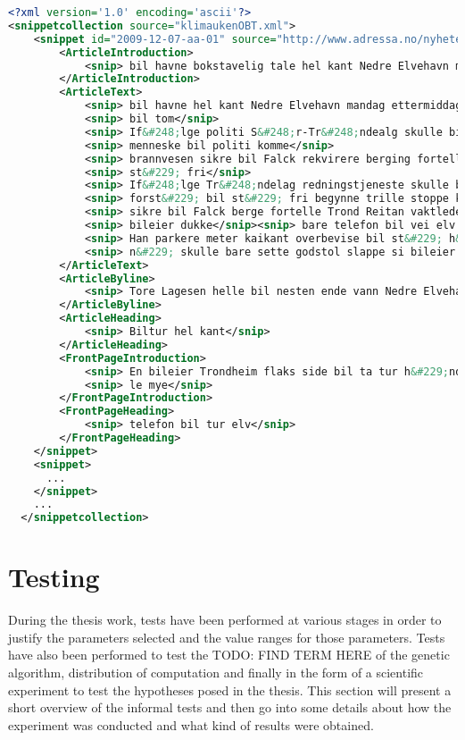 \begin{lstlisting}[float=f, language=xml, breaklines=true, label=lst:snippetfile, caption={Snippet file encoded in XML}]
<?xml version='1.0' encoding='ascii'?>
<snippetcollection source="klimaukenOBT.xml">
    <snippet id="2009-12-07-aa-01" source="http://www.adressa.no/nyheter/trondheim/article1419658.ece" tags="Innenriks-ulykker-trafikk-utforkj&#248;ring-trondheim">
        <ArticleIntroduction>
            <snip> bil havne bokstavelig tale hel kant Nedre Elvehavn mandag ettermiddag</snip>
        </ArticleIntroduction>
        <ArticleText>
            <snip> bil havne hel kant Nedre Elvehavn mandag ettermiddag</snip>
            <snip> bil tom</snip>
            <snip> If&#248;lge politi S&#248;r-Tr&#248;ndealg skulle bil tom komme sted</snip>
            <snip> menneske bil politi komme</snip>
            <snip> brannvesen sikre bil Falck rekvirere berging fortelle Curt Ivar R&#248;hmen operasjonsleder S&#248;r-Tr&#248;ndelag politidistrikt</snip>
            <snip> st&#229; fri</snip>
            <snip> If&#248;lge Tr&#248;ndelag redningstjeneste skulle bil begynne rulle h&#229;nd</snip>
            <snip> forst&#229; bil st&#229; fri begynne trille stoppe kant</snip>
            <snip> sikre bil Falck berge fortelle Trond Reitan vaktleder 110-sentral</snip>
            <snip> bileier dukke</snip><snip> bare telefon bil vei elv si Tore Lagesen</snip>
            <snip> Han parkere meter kaikant overbevise bil st&#229; h&#229;ndbrekk</snip>
            <snip> n&#229; skulle bare sette godstol slappe si bileier hvilepuls</snip>
        </ArticleText>
        <ArticleByline>
            <snip> Tore Lagesen helle bil nesten ende vann Nedre Elvehavn</snip>
        </ArticleByline>
        <ArticleHeading>
            <snip> Biltur hel kant</snip>
        </ArticleHeading>
        <FrontPageIntroduction>
            <snip> En bileier Trondheim flaks side bil ta tur h&#229;nd mandag ettermiddag</snip>
            <snip> le mye</snip>
        </FrontPageIntroduction>
        <FrontPageHeading>
            <snip> telefon bil tur elv</snip>
        </FrontPageHeading>
    </snippet>
    <snippet>
      ...
    </snippet>
    ...
  </snippetcollection>
\end{lstlisting}

\section{Testing}
\label{Testing}
During the thesis work, tests have been performed at various stages in order to justify the parameters selected and the value ranges for those parameters. Tests have also been performed to test the TODO: FIND TERM HERE of the genetic algorithm, distribution of computation and finally in the form of a scientific experiment to test the hypotheses posed in the thesis. This section will present a short overview of the informal tests and then go into some details about how the experiment was conducted and what kind of results were obtained. 

